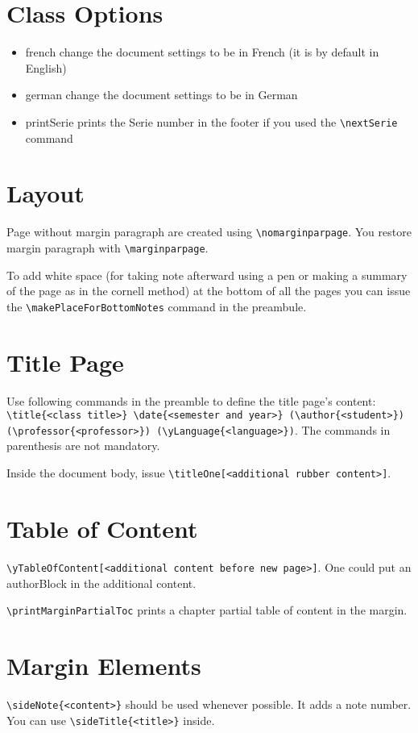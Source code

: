 \documentclass[a4paper, 11pt, oneside, fleqn]{article}
\begin{document}
	
	\begin{multicols}{2}
		\section{Class Options}
		\begin{itemize}
			\item french change the document settings to be in French (it is by default in English)
			\item german change the document settings to be in German
			\item printSerie prints the Serie number in the footer if you used the \lstinline|\nextSerie| command
		\end{itemize}
		
		
		\section{Layout}
		Page without margin paragraph are created using \lstinline|\nomarginparpage|. You restore margin paragraph with \lstinline|\marginparpage|.
		
		To add white space (for taking note afterward using a pen or making a summary of the page as in the cornell method) at the bottom of all the pages you can issue the \lstinline|\makePlaceForBottomNotes| command in the preambule.
		
		
		\section{Title Page}
		Use following commands in the preamble to define the title page's content: \lstinline[breaklines]|\title{<class title>} \date{<semester and year>} (\author{<student>}) (\professor{<professor>}) (\yLanguage{<language>})|. The commands in parenthesis are not mandatory.
		
		Inside the document body, issue \lstinline|\titleOne[<additional rubber content>]|.
		
		
		\section{Table of Content}
		\lstinline[breaklines]|\yTableOfContent[<additional content before new page>]|. One could put an authorBlock in the additional content.
		
		\lstinline[breaklines]|\printMarginPartialToc| prints a chapter partial table of content in the margin.
		
		
		\section{Margin Elements}
		\lstinline[breaklines]|\sideNote{<content>}| should be used whenever possible. It adds a note number. You can use \lstinline[breaklines]|\sideTitle{<title>}| inside.
		

\end{multicols}
\end{document}
